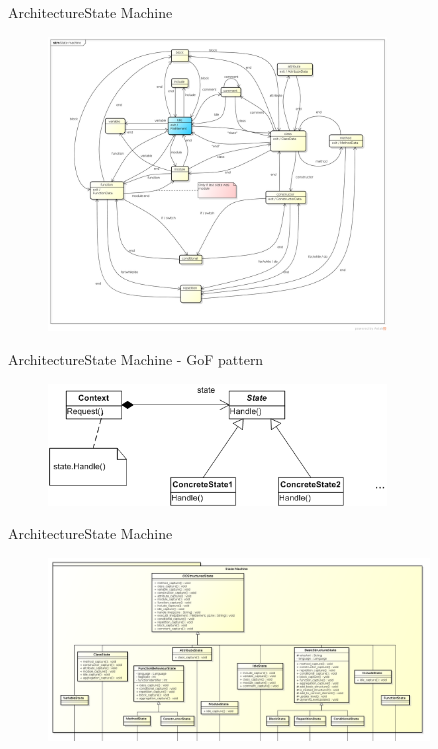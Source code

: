\documentclass[10pt]{beamer}
\begin{document}
\begin{frame}{Architecture}{State Machine}
  \begin{figure}[All]
    \includegraphics[width=0.8\textwidth]{images/fsm.png}
  \end{figure}
\end{frame}

\begin{frame}{Architecture}{State Machine - GoF pattern}
  \begin{figure}[stategof]
    \includegraphics[width=0.8\textwidth]{images/state.png}
  \end{figure}
\end{frame}

\begin{frame}{Architecture}{State Machine}
  \begin{figure}[All]
    \includegraphics[width=0.9\textwidth]{images/fsmPack.png}
  \end{figure}
\end{frame}
\end{document}
